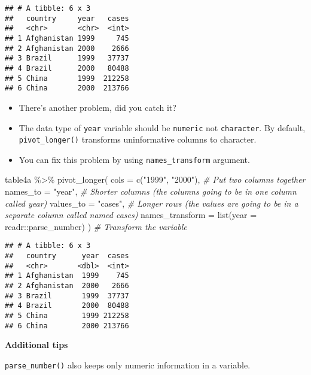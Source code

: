\documentclass[
]{book}
\newenvironment{Shaded}{\begin{snugshade}}{\end{snugshade}}
\newcommand{\AttributeTok}[1]{\textcolor[rgb]{0.77,0.63,0.00}{#1}}
\newcommand{\CommentTok}[1]{\textcolor[rgb]{0.56,0.35,0.01}{\textit{#1}}}
\newcommand{\FunctionTok}[1]{\textcolor[rgb]{0.00,0.00,0.00}{#1}}
\newcommand{\NormalTok}[1]{#1}
\newcommand{\SpecialCharTok}[1]{\textcolor[rgb]{0.00,0.00,0.00}{#1}}
\newcommand{\StringTok}[1]{\textcolor[rgb]{0.31,0.60,0.02}{#1}}
\begin{document}
\begin{verbatim}
## # A tibble: 6 x 3
##   country     year   cases
##   <chr>       <chr>  <int>
## 1 Afghanistan 1999     745
## 2 Afghanistan 2000    2666
## 3 Brazil      1999   37737
## 4 Brazil      2000   80488
## 5 China       1999  212258
## 6 China       2000  213766
\end{verbatim}

\begin{itemize}
\item
  There's another problem, did you catch it?
\item
  The data type of \texttt{year} variable should be \texttt{numeric} not \texttt{character}. By default, \texttt{pivot\_longer()} transforms uninformative columns to character.
\item
  You can fix this problem by using \texttt{names\_transform} argument.
\end{itemize}

\begin{Shaded}
\begin{Highlighting}[]
\NormalTok{table4a }\SpecialCharTok{\%\textgreater{}\%}
  \FunctionTok{pivot\_longer}\NormalTok{(}
    \AttributeTok{cols =} \FunctionTok{c}\NormalTok{(}\StringTok{"1999"}\NormalTok{, }\StringTok{"2000"}\NormalTok{), }\CommentTok{\# Put two columns together}
    \AttributeTok{names\_to =} \StringTok{"year"}\NormalTok{, }\CommentTok{\# Shorter columns (the columns going to be in one column called year)}
    \AttributeTok{values\_to =} \StringTok{"cases"}\NormalTok{, }\CommentTok{\# Longer rows (the values are going to be in a separate column called named cases)}
    \AttributeTok{names\_transform =} \FunctionTok{list}\NormalTok{(}\AttributeTok{year =}\NormalTok{ readr}\SpecialCharTok{::}\NormalTok{parse\_number)}
\NormalTok{  ) }\CommentTok{\# Transform the variable}
\end{Highlighting}
\end{Shaded}

\begin{verbatim}
## # A tibble: 6 x 3
##   country      year  cases
##   <chr>       <dbl>  <int>
## 1 Afghanistan  1999    745
## 2 Afghanistan  2000   2666
## 3 Brazil       1999  37737
## 4 Brazil       2000  80488
## 5 China        1999 212258
## 6 China        2000 213766
\end{verbatim}

\textbf{Additional tips}

\texttt{parse\_number()} also keeps only numeric information in a variable.
\end{document}
